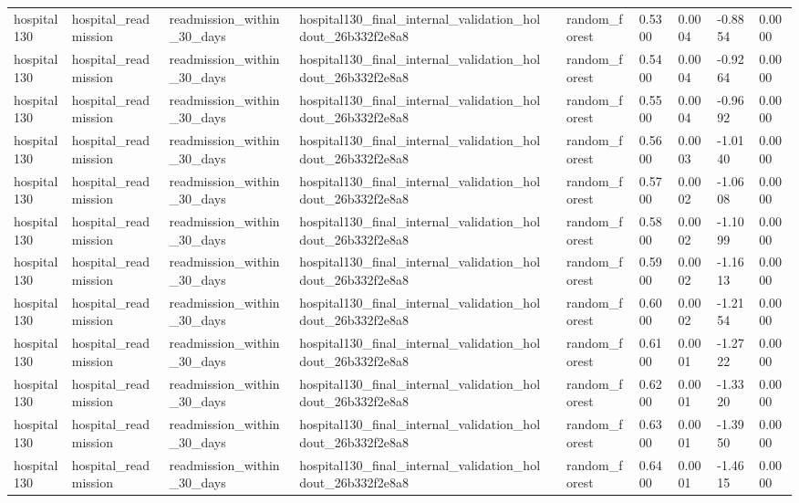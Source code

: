\begin{tabular}{llllllllll}
hospital130 & hospital\_readmission & readmission\_within\_30\_days & hospital130\_final\_internal\_validation\_holdout\_26b332f2e8a8 &  & random\_forest & 0.5300 & 0.0004 & -0.8854 & 0.0000 \\
hospital130 & hospital\_readmission & readmission\_within\_30\_days & hospital130\_final\_internal\_validation\_holdout\_26b332f2e8a8 &  & random\_forest & 0.5400 & 0.0004 & -0.9264 & 0.0000 \\
hospital130 & hospital\_readmission & readmission\_within\_30\_days & hospital130\_final\_internal\_validation\_holdout\_26b332f2e8a8 &  & random\_forest & 0.5500 & 0.0004 & -0.9692 & 0.0000 \\
hospital130 & hospital\_readmission & readmission\_within\_30\_days & hospital130\_final\_internal\_validation\_holdout\_26b332f2e8a8 &  & random\_forest & 0.5600 & 0.0003 & -1.0140 & 0.0000 \\
hospital130 & hospital\_readmission & readmission\_within\_30\_days & hospital130\_final\_internal\_validation\_holdout\_26b332f2e8a8 &  & random\_forest & 0.5700 & 0.0002 & -1.0608 & 0.0000 \\
hospital130 & hospital\_readmission & readmission\_within\_30\_days & hospital130\_final\_internal\_validation\_holdout\_26b332f2e8a8 &  & random\_forest & 0.5800 & 0.0002 & -1.1099 & 0.0000 \\
hospital130 & hospital\_readmission & readmission\_within\_30\_days & hospital130\_final\_internal\_validation\_holdout\_26b332f2e8a8 &  & random\_forest & 0.5900 & 0.0002 & -1.1613 & 0.0000 \\
hospital130 & hospital\_readmission & readmission\_within\_30\_days & hospital130\_final\_internal\_validation\_holdout\_26b332f2e8a8 &  & random\_forest & 0.6000 & 0.0002 & -1.2154 & 0.0000 \\
hospital130 & hospital\_readmission & readmission\_within\_30\_days & hospital130\_final\_internal\_validation\_holdout\_26b332f2e8a8 &  & random\_forest & 0.6100 & 0.0001 & -1.2722 & 0.0000 \\
hospital130 & hospital\_readmission & readmission\_within\_30\_days & hospital130\_final\_internal\_validation\_holdout\_26b332f2e8a8 &  & random\_forest & 0.6200 & 0.0001 & -1.3320 & 0.0000 \\
hospital130 & hospital\_readmission & readmission\_within\_30\_days & hospital130\_final\_internal\_validation\_holdout\_26b332f2e8a8 &  & random\_forest & 0.6300 & 0.0001 & -1.3950 & 0.0000 \\
hospital130 & hospital\_readmission & readmission\_within\_30\_days & hospital130\_final\_internal\_validation\_holdout\_26b332f2e8a8 &  & random\_forest & 0.6400 & 0.0001 & -1.4615 & 0.0000 \\

\end{tabular}
